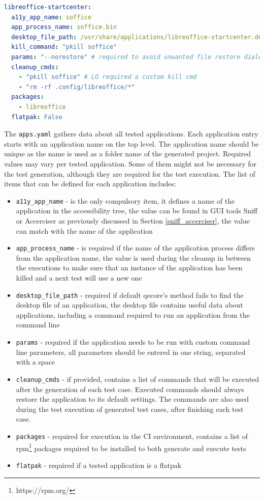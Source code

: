 \begin{lstlisting}[language=yaml,caption={Example of the apps.yaml entry for LibreOffice Start Center},label={apps.yaml}]
libreoffice-startcenter:
  a11y_app_name: soffice
  app_process_name: soffice.bin
  desktop_file_path: /usr/share/applications/libreoffice-startcenter.desktop
  kill_command: "pkill soffice"
  params: "--norestore" # required to avoid unwanted file restore dialogs
  cleanup_cmds:
    - "pkill soffice" # LO required a custom kill cmd
    - "rm -rf .config/libreoffice/*"
  packages:
    - libreoffice
  flatpak: False
\end{lstlisting}

The \texttt{apps.yaml} gathers data about all tested applications. Each application entry starts with an application name on the top level. The application name should be unique as the name is used as a folder name of the generated project. Required values may vary per tested application. Some of them might not be necessary for the test generation, although they are required for the test execution.
The list of items that can be defined for each application includes:

\begin{itemize}
    \item \texttt{a11y\_app\_name} - is the only compulsory item, it defines a name of the application in the accessibility tree, the value can be found in GUI tools Sniff or Accerciser as previously discussed in Section \ref{sniff_accerciser}, the value can match with the name of the application
     \item \texttt{app\_process\_name} - is required if the name of the application process differs from the application name, the value is used during the cleanup in between the executions to make sure that an instance of the application has been killed and a next test will use a new one
     \item \texttt{desktop\_file\_path} - required if default qecore's method fails to find the desktop file of an application, the desktop file contains useful data about applications, including a command required to run an application from the command line
     \item \texttt{params} - required if the application needs to be run with custom command line parameters, all parameters should be entered in one string, separated with a space
     \item \texttt{cleanup\_cmds} - if provided, contains a list of commands that will be executed after the generation of each test case. Executed commands should always restore the application to its default settings. The commands are also used during the test execution of generated test cases, after finishing each test case. 
     \item \texttt{packages} - required for execution in the CI environment, contains a list of rpm\footnote{https://rpm.org/} packages required to be installed to both generate and execute tests
     \item \texttt{flatpak} - required if a tested application is a flatpak
\end{itemize}

